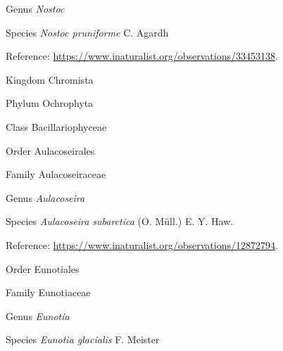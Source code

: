 \documentclass[9pt, article]{memoir}
\begin{document}
\begin{multicols}{2}
\vspace{6pt}\noindent\hspace{30pt}Genus \textit{Nostoc}


\vspace{6pt}\noindent\hspace{36pt}Species \textit{Nostoc pruniforme} C. Agardh


Reference: 
\url{https://www.inaturalist.org/observations/33453138}.

\vspace{6pt}\noindent\hspace{0pt}Kingdom Chromista


\vspace{6pt}\noindent\hspace{6pt}Phylum Ochrophyta


\vspace{6pt}\noindent\hspace{12pt}Class Bacillariophyceae


\vspace{6pt}\noindent\hspace{18pt}Order Aulacoseirales


\vspace{6pt}\noindent\hspace{24pt}Family Aulacoseiraceae


\vspace{6pt}\noindent\hspace{30pt}Genus \textit{Aulacoseira}


\vspace{6pt}\noindent\hspace{36pt}Species \textit{Aulacoseira subarctica} (O. Müll.) E. Y. Haw.


Reference: 
\url{https://www.inaturalist.org/observations/12872794}.

\vspace{6pt}\noindent\hspace{18pt}Order Eunotiales


\vspace{6pt}\noindent\hspace{24pt}Family Eunotiaceae


\vspace{6pt}\noindent\hspace{30pt}Genus \textit{Eunotia}


\vspace{6pt}\noindent\hspace{36pt}Species \textit{Eunotia glacialis} F. Meister



\end{multicols}
\end{document}
